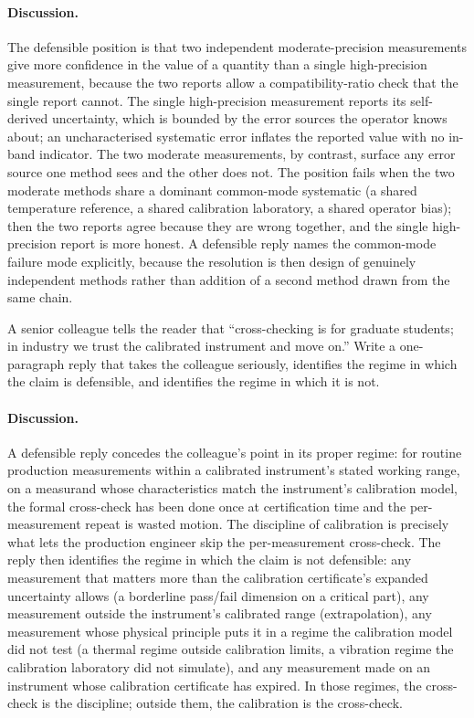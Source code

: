\paragraph{Discussion.}
The defensible position is that two independent moderate-precision
measurements give more confidence in the value of a quantity than a
single high-precision measurement, because the two reports allow a
compatibility-ratio check that the single report cannot. The
single high-precision measurement reports its self-derived
uncertainty, which is bounded by the error sources the operator
knows about; an uncharacterised systematic error inflates the
reported value with no in-band indicator. The two moderate
measurements, by contrast, surface any error source one method
sees and the other does not. The position fails when the two
moderate methods share a dominant common-mode systematic (a shared
temperature reference, a shared calibration laboratory, a shared
operator bias); then the two reports agree because they are wrong
together, and the single high-precision report is more honest.
A defensible reply names the common-mode failure mode explicitly,
because the resolution is then design of genuinely independent
methods rather than addition of a second method drawn from the
same chain.

\begin{exercise}
A senior colleague tells the reader that ``cross-checking is for
graduate students; in industry we trust the calibrated instrument
and move on.'' Write a one-paragraph reply that takes the colleague
seriously, identifies the regime in which the claim is defensible,
and identifies the regime in which it is not.
\end{exercise}

\paragraph{Discussion.}
A defensible reply concedes the colleague's point in its proper
regime: for routine production measurements within a calibrated
instrument's stated working range, on a measurand whose
characteristics match the instrument's calibration model, the
formal cross-check has been done once at certification time and
the per-measurement repeat is wasted motion. The discipline of
calibration is precisely what lets the production engineer skip
the per-measurement cross-check. The reply then identifies the
regime in which the claim is not defensible: any measurement that
matters more than the calibration certificate's expanded
uncertainty allows (a borderline pass/fail dimension on a critical
part), any measurement outside the instrument's calibrated range
(extrapolation), any measurement whose physical principle puts it
in a regime the calibration model did not test (a thermal regime
outside calibration limits, a vibration regime the calibration
laboratory did not simulate), and any measurement made on an
instrument whose calibration certificate has expired. In those
regimes, the cross-check is the discipline; outside them, the
calibration is the cross-check.

